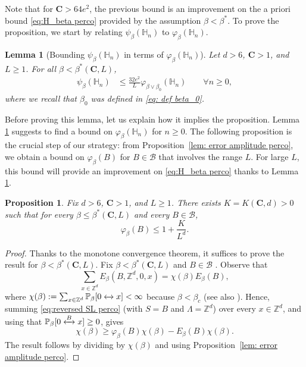 \documentclass[11pt,a4paper]{article}
\numberwithin{equation}{section}
\theoremstyle{plain}
\newtheorem{Lem}[Thm]{Lemma}
\newtheorem{Prop}[Thm]{Proposition}
\theoremstyle{definition}
\newcommand\bfC{\mathbf{C}}
\newcommand{\connect}{\xleftrightarrow}
\begin{document}
Note that for $\bfC>64 e^2$, the previous bound is an improvement on the a priori bound \eqref{eq:H_beta perco} provided by the assumption $\beta<\beta^*$.
To prove the proposition, we start by relating $\psi_\beta(\mathbb H_n)$ to $\varphi_\beta(\mathbb H_n)$. 
%
%
\begin{Lem}[Bounding $\psi_\beta(\mathbb H_n)$ in terms of $\varphi_\beta(\mathbb H_n)$]\label{lem: small values 1 perco} Let $d>6$, $\bfC>1$, and $L\geq 1$. For all $\beta<\beta^*(\bfC,L)$,
\begin{align}
 \label{eq: improve psi small values}
\psi_\beta(\mathbb H_n)&\le\frac{32e^2}{L}\varphi_{\beta\vee \beta_0}(\mathbb H_n)\qquad\forall n\ge0,
\end{align}
where we recall that $\beta_0$ was defined in \eqref{eq: def beta_0}.
\end{Lem}

Before proving this lemma, let us explain how it implies the proposition.
Lemma \ref{lem: small values 1 perco} suggests to find a bound on $\varphi_\beta(\mathbb H_n)$ for $n\geq 0$. The following proposition is the crucial step of our strategy: from Proposition~\ref{lem: error amplitude perco}, we obtain a bound on $\varphi_\beta(B)$ for $B\in\mathcal B$ that involves the range $L$. For large $L$, this bound will provide an improvement on \eqref{eq:H_beta perco} thanks to Lemma \ref{lem: small values 1 perco}.
\begin{Prop}\label{prop:bound phi perco}
Fix $d>6$, $\bfC>1$, and $L\geq 1$.  There exists $K=K(\bfC,d)>0$ such that for every $\beta\leq\beta^*(\bfC,L)$ and every $B\in\mathcal B$,
\begin{equation}
\varphi_\beta(B)\leq 1+\frac{K}{L^{d}}.
\end{equation}
\end{Prop}
\begin{proof} Thanks to the monotone convergence theorem, it suffices to prove the result for $\beta<\beta^*(\bfC,L)$. Fix $\beta<\beta^*(\bfC,L)$ and $B\in\mathcal B$ . Observe that
\begin{equation}
	\sum_{x\in \mathbb Z^d}E_\beta(B,\mathbb Z^d,0,x)=\chi(\beta)E_\beta(B),
\end{equation}
where $\chi(\beta):=\sum_{x\in \mathbb Z^d}\mathbb P_\beta[0\connect{\:}x]<\infty$ because $\beta<\beta_c$ \cite{Mensikov1986coincidence,AizenmanBarsky1987sharpnessPerco} (see also \cite{DuminilTassionNewProofSharpness2016}).
Hence, summing \eqref{eq:reversed SL perco} (with $S=B$ and $\Lambda=\mathbb Z^d$) over every $x\in \mathbb Z^d$, and using that $\mathbb P_\beta[0\connect{B\:}x]\geq 0$, gives
\begin{equation}
\chi(\beta)\geq \varphi_\beta(B)\chi(\beta)-E_\beta(B)\chi(\beta).
\end{equation}
The result follows by dividing by $\chi(\beta)$ and using Proposition~\ref{lem: error amplitude perco}.
\end{proof}
\end{document}
